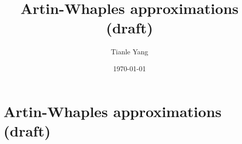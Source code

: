 \documentclass{noteformyself}
\title{Artin-Whaples approximations (draft)}
\author{Tianle Yang}
\date{\today}
\begin{document}
    \maketitle

    \section{Artin-Whaples approximations (draft)}



\end{document}
